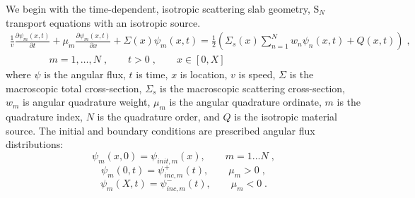 We begin with the time-dependent, isotropic scattering slab geometry, S$_N$ transport equations with an isotropic source.
\begin{multline}
    \label{eq:sn_nte}
    \frac{1}{v} \frac{\partial \psi_{m}(x,t)}{\partial t} + \mu_m \frac{\partial \psi_{m}(x,t)}{\partial x} + \Sigma(x) \psi_{m}(x,t) 
     = \frac{1}{2} \left( \Sigma_{s}(x) \sum\limits_{n=1}^N w_n \psi_{n}(x,t) + Q(x,t) \right) \;, \\
    \qquad \qquad m=1, \ldots, N \;, \qquad t > 0 \;, \qquad x \in [0,X]
\end{multline}
where $\psi$ is the angular flux, $t$ is time, $x$ is location, $v$ is speed, $\Sigma$ is the macroscopic total cross-section, $\Sigma_s$ is the macroscopic scattering cross-section, $w_m$ is angular quadrature weight, $\mu_m$ is the angular quadrature ordinate, $m$ is the quadrature index, $N$ is the quadrature order, and $Q$ is the isotropic material source.
The initial and boundary conditions are prescribed angular flux distributions:
\begin{equation*}
    \psi_{m}(x,0) = \psi_{init,m}(x), \qquad m=1 \ldots N \;,
\end{equation*}
\begin{equation*}
    \psi_{m}(0,t) = \psi_{inc,m}^+(t), \qquad \mu_m >0 \;,
\end{equation*}
\begin{equation*}
    \psi_{m}(X,t) = \psi_{inc,m}^-(t), \qquad \mu_m <0 \;.
\end{equation*}

